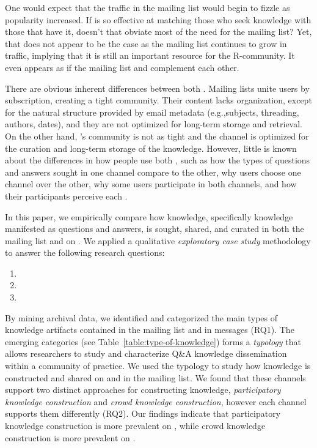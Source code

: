 One would expect that the traffic in the \RH mailing list would begin to fizzle as \SO popularity increased. If \SO is so effective at matching those who seek knowledge with those that have it, doesn't that obviate most of the need for the \RH mailing list? Yet, that does not appear to be the case as the \RH mailing list continues to grow in traffic, implying that it is still an important resource for the R-community. It even appears as if the mailing list and \SO complement each other.

There are obvious inherent differences between both \channels. Mailing lists unite users by subscription, creating a tight community. Their content lacks organization, except for the natural structure provided by email metadata (e.g.,subjects, threading, authors, dates), and they are not optimized for long-term storage and retrieval. On the other hand, \SO's community is not as tight and the channel is optimized for the curation and long-term storage of the knowledge. However, little is known about the differences in how people use both \channels, such as how the types of questions and answers sought in one channel compare to the other, why users choose one channel over the other, why some users participate in both channels, and how their participants perceive each \channel.



In this paper, we empirically compare how knowledge, specifically knowledge manifested as questions and answers, is sought, shared, and curated in both the \RH mailing list and on \SO. We applied a qualitative \textit{exploratory case study} methodology to answer the following research questions:

\begin{enumerate}[label=\bfseries{RQ\arabic*.},itemsep=3pt, topsep=2pt, leftmargin=3em, parsep=0pt]
        \item \rqa
        \item \rqb
        \item \rqc
    \end{enumerate}

By mining archival data, we identified and categorized the main types of knowledge artifacts contained in the \RH mailing list and in \SO messages (RQ1). The emerging categories (see Table~\ref{table:type-of-knowledge}) forms a \textit{typology} that allows researchers to study and characterize Q\&A knowledge dissemination within a community of practice. We used the typology to study how knowledge is constructed and shared on \SO and in the \RH mailing list. We found that these channels support two distinct approaches for constructing knowledge, \textit{participatory knowledge construction} and \textit{crowd knowledge construction}, however each channel supports them differently (RQ2). Our findings indicate that participatory knowledge construction is more prevalent on \RH, while crowd knowledge construction is more prevalent on \SO.

